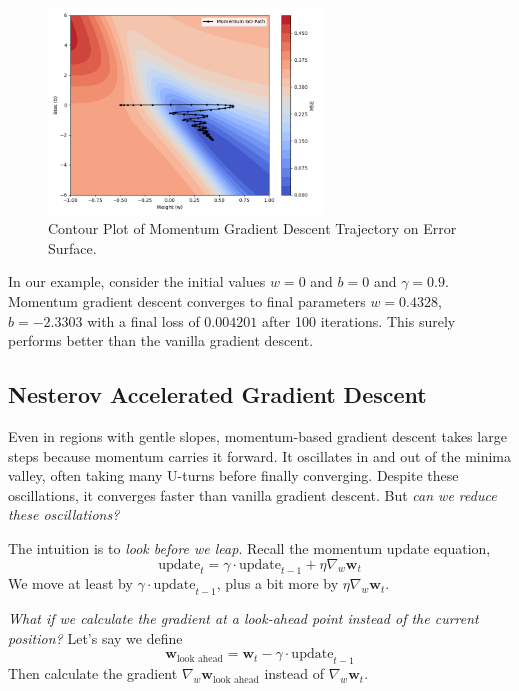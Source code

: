\begin{figure}[h!]
    \centering
    \includegraphics[width=0.65\textwidth]{content/section01/chapter01/figs/momentum_grad_desc_contour.png}
    \caption{Contour Plot of Momentum Gradient Descent Trajectory on Error Surface.}
\end{figure}

In our example, consider the initial values \( w = 0 \) and \( b = 0 \) and $\gamma = 0.9$. Momentum gradient descent converges to final parameters \( w = 0.4328 \), \( b = -2.3303 \) with a final loss of \( 0.004201 \) after 100 iterations. This surely performs better than the vanilla gradient descent. 

\subsection{Nesterov Accelerated Gradient Descent}

Even in regions with gentle slopes, momentum-based gradient descent takes large steps because momentum carries it forward. It oscillates in and out of the minima valley, often taking many U-turns before finally converging. Despite these oscillations, it converges faster than vanilla gradient descent. But \textit{can we reduce these oscillations?}

The intuition is to \textit{look before we leap}. Recall the momentum update equation,
\[
\text{update}_t = \gamma \cdot \text{update}_{t-1} + \eta \nabla_w \mathbf{w}_t
\]
We move at least by \(\gamma \cdot \text{update}_{t-1}\), plus a bit more by \(\eta \nabla_w \mathbf{w}_t\).

\textit{What if we calculate the gradient at a look-ahead point instead of the current position?} Let's say we define
\[
\mathbf{w}_{\text{look ahead}} = \mathbf{w}_t - \gamma \cdot \text{update}_{t-1}
\]
Then calculate the gradient \(\nabla_w \mathbf{w}_{\text{look ahead}}\) instead of \(\nabla_w \mathbf{w}_t\).

